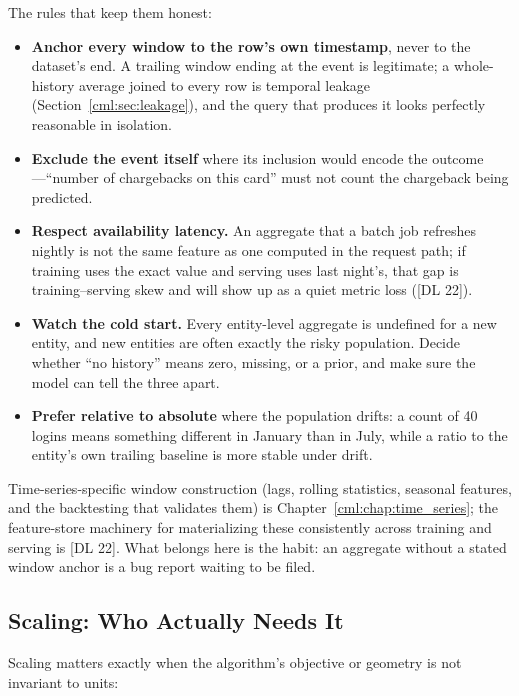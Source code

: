 The rules that keep them honest:
\begin{itemize}
    \item \textbf{Anchor every window to the row's own timestamp}, never to the dataset's end. A trailing window ending at the event is legitimate; a whole-history average joined to every row is temporal leakage (Section~\ref{cml:sec:leakage}), and the query that produces it looks perfectly reasonable in isolation.
    \item \textbf{Exclude the event itself} where its inclusion would encode the outcome---``number of chargebacks on this card'' must not count the chargeback being predicted.
    \item \textbf{Respect availability latency.} An aggregate that a batch job refreshes nightly is not the same feature as one computed in the request path; if training uses the exact value and serving uses last night's, that gap is training--serving skew and will show up as a quiet metric loss ([DL 22]).
    \item \textbf{Watch the cold start.} Every entity-level aggregate is undefined for a new entity, and new entities are often exactly the risky population. Decide whether ``no history'' means zero, missing, or a prior, and make sure the model can tell the three apart.
    \item \textbf{Prefer relative to absolute} where the population drifts: a count of 40 logins means something different in January than in July, while a ratio to the entity's own trailing baseline is more stable under drift.
\end{itemize}

Time-series-specific window construction (lags, rolling statistics, seasonal features, and the backtesting that validates them) is Chapter~\ref{cml:chap:time_series}; the feature-store machinery for materializing these consistently across training and serving is [DL 22]. What belongs here is the habit: an aggregate without a stated window anchor is a bug report waiting to be filed.

\subsection{Scaling: Who Actually Needs It}

Scaling matters exactly when the algorithm's objective or geometry is not invariant to units:

